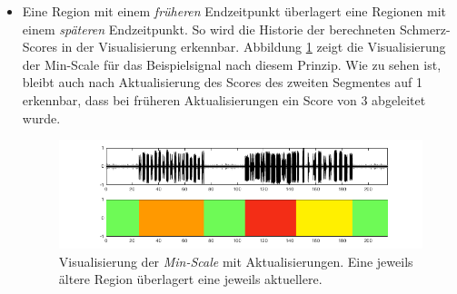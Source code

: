 \begin{itemize}
\item Eine Region mit einem \emph{früheren} Endzeitpunkt überlagert eine Regionen mit einem \emph{späteren} Endzeitpunkt. So wird die Historie der berechneten Schmerz-Scores in der Visualisierung erkennbar. Abbildung \ref{fig:viz_act_under} zeigt die Visualisierung der Min-Scale für das Beispielsignal nach diesem Prinzip. Wie zu sehen ist, bleibt auch nach Aktualisierung des Scores des zweiten Segmentes auf 1 erkennbar, dass bei früheren Aktualisierungen ein Score von 3 abgeleitet wurde.

\begin{figure}[h]
	\centering
	\includegraphics[width=1\textwidth]{bilder/viz_act_under_02.png}
	\caption[Visualisierung der bei Aktualisierungen mit Priorisierung der vorangegangenen Schmerzbewertung]{Visualisierung der \emph{Min-Scale} mit Aktualisierungen. Eine jeweils \glqq ältere\grqq{} Region überlagert eine jeweils \glqq aktuellere\grqq{}.}
	\label{fig:viz_act_under}
\end{figure}
 
\end{itemize}
